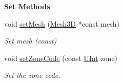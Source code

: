 \begin{Indent}{\bf Set Methods}\par
\begin{DoxyCompactItemize}
\item 
void \hyperlink{classFVCode3D_1_1Mesh3D_1_1Cell3D_a571ac1db12b2ba39397f9222b66c0475}{set\+Mesh} (\hyperlink{classFVCode3D_1_1Mesh3D}{Mesh3D} $\ast$const mesh)
\begin{DoxyCompactList}\small\item\em Set mesh (const) \end{DoxyCompactList}\item 
void \hyperlink{classFVCode3D_1_1Mesh3D_1_1Cell3D_a2fba29998c208490d7e812a4bf979a29}{set\+Zone\+Code} (const \hyperlink{namespaceFVCode3D_a4bf7e328c75d0fd504050d040ebe9eda}{U\+Int} zone)
\begin{DoxyCompactList}\small\item\em Set the zone code. \end{DoxyCompactList}\end{DoxyCompactItemize}
\end{Indent}
